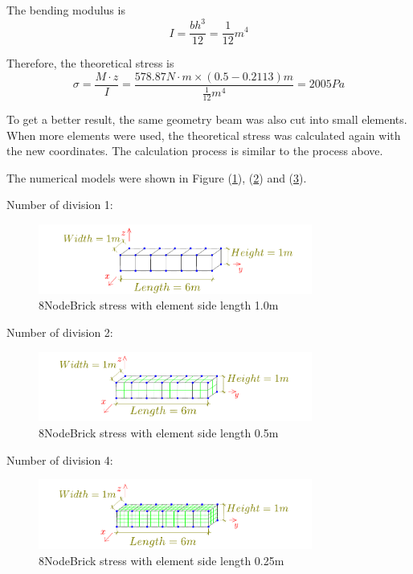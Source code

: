 \documentclass[fleqn,11pt,letter]{article}
\begin{document}
The bending modulus is 
\begin{equation}
  I= \frac{bh^3}{12}=\frac{1}{12} m^4
\end{equation}

Therefore, the theoretical stress is 
\begin{equation}
  \sigma= \frac{M\cdot z}{I}= \frac{578.87 N\cdot m \times (0.5-0.2113) m }{\frac{1}{12} m^4}= 2005 Pa
\end{equation}



To get a better result, the same geometry beam was also cut into small elements. When more elements were used, the theoretical stress was calculated again with the new coordinates. The calculation process is similar to the process above. 

The numerical models were shown in Figure (\ref{fig 8NodeBrick stress with element side length 1.0m}), (\ref{fig 8NodeBrick stress with element side length 0.5m}) and (\ref{fig 8NodeBrick stress with element side length 0.25m}). 


Number of division 1:

\begin{figure}[H]
  \centering
  \includegraphics[width=9cm]{../Figure_files/8NodeBrick/beam_8brick.pdf}
  \caption{8NodeBrick stress with element side length 1.0m}
  \label{fig 8NodeBrick stress with element side length 1.0m}
\end{figure}

Number of division 2:

\begin{figure}[H]
  \centering
  \includegraphics[width=9cm]{../Figure_files/8NodeBrick/beam_8brick_more_2.pdf}
  \caption{8NodeBrick stress with element side length 0.5m}
  \label{fig 8NodeBrick stress with element side length 0.5m}
\end{figure}

Number of division 4:

\begin{figure}[H]
  \centering
  \includegraphics[width=9cm]{../Figure_files/8NodeBrick/beam_8brick_more.pdf}
  \caption{8NodeBrick stress with element side length 0.25m}
  \label{fig 8NodeBrick stress with element side length 0.25m}
\end{figure}
\end{document}
